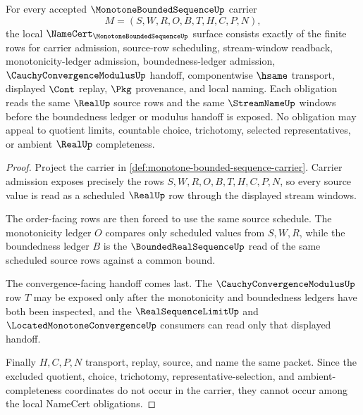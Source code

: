 \begin{theorem}
\label{thm:monotone-bounded-sequence-namecert-obligations}
For every accepted $\MonotoneBoundedSequenceUp$ carrier
$$
M=(S,W,R,O,B,T,H,C,P,N),
$$
the local $\NameCert_{\MonotoneBoundedSequenceUp}$ surface consists exactly of the finite rows for carrier admission, source-row scheduling, stream-window readback, monotonicity-ledger admission, boundedness-ledger admission, $\CauchyConvergenceModulusUp$ handoff, componentwise $\hsame$ transport, displayed $\Cont$ replay, $\Pkg$ provenance, and local naming. Each obligation reads the same $\RealUp$ source rows and the same $\StreamNameUp$ windows before the boundedness ledger or modulus handoff is exposed. No obligation may appeal to quotient limits, countable choice, trichotomy, selected representatives, or ambient $\RealUp$ completeness.
\end{theorem}
\begin{proof}
Project the carrier in \autoref{def:monotone-bounded-sequence-carrier}. Carrier admission exposes precisely the rows $S,W,R,O,B,T,H,C,P,N$, so every source value is read as a scheduled $\RealUp$ row through the displayed stream windows.

The order-facing rows are then forced to use the same source schedule. The monotonicity ledger $O$ compares only scheduled values from $S,W,R$, while the boundedness ledger $B$ is the $\BoundedRealSequenceUp$ read of the same scheduled source rows against a common bound.

The convergence-facing handoff comes last. The $\CauchyConvergenceModulusUp$ row $T$ may be exposed only after the monotonicity and boundedness ledgers have both been inspected, and the $\RealSequenceLimitUp$ and $\LocatedMonotoneConvergenceUp$ consumers can read only that displayed handoff.

Finally $H,C,P,N$ transport, replay, source, and name the same packet. Since the excluded quotient, choice, trichotomy, representative-selection, and ambient-completeness coordinates do not occur in the carrier, they cannot occur among the local NameCert obligations.
\end{proof}

